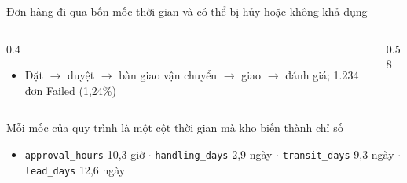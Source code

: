 \begin{frame}{Đơn hàng đi qua bốn mốc thời gian và có thể bị hủy hoặc không khả dụng}
\begin{columns}[T]\begin{column}{0.4\textwidth}
\begin{itemize}
  \item Đặt $\rightarrow$ duyệt $\rightarrow$ bàn giao vận chuyển $\rightarrow$ giao $\rightarrow$ đánh giá; 1.234 đơn Failed (1,24\%)
\end{itemize}
\end{column}\begin{column}{0.58\textwidth}
\begin{center}\end{center}
\end{column}\end{columns}

\end{frame}

\begin{frame}{Mỗi mốc của quy trình là một cột thời gian mà kho biến thành chỉ số}
\begin{itemize}
  \item \texttt{approval\_\allowbreak{}hours} 10,3 giờ $\cdot$ \texttt{handling\_\allowbreak{}days} 2,9 ngày $\cdot$ \texttt{transit\_\allowbreak{}days} 9,3 ngày $\cdot$ \texttt{lead\_\allowbreak{}days} 12,6 ngày
\end{itemize}
\begin{center}\end{center}

\end{frame}

